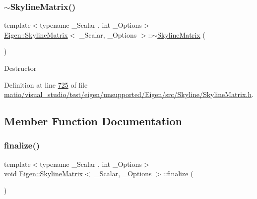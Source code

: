 \mbox{\label{class_eigen_1_1_skyline_matrix_a456b254a757d26580b2c05fe270eaae7}} 
\subsubsection{\texorpdfstring{$\sim$\+Skyline\+Matrix()}{~SkylineMatrix()}\hspace{0.1cm}{\footnotesize\ttfamily [2/2]}}
{\footnotesize\ttfamily template$<$typename \+\_\+\+Scalar , int \+\_\+\+Options$>$ \\
\hyperlink{class_eigen_1_1_skyline_matrix}{Eigen\+::\+Skyline\+Matrix}$<$ \+\_\+\+Scalar, \+\_\+\+Options $>$\+::$\sim$\hyperlink{class_eigen_1_1_skyline_matrix}{Skyline\+Matrix} (\begin{DoxyParamCaption}{ }\end{DoxyParamCaption})\hspace{0.3cm}{\ttfamily [inline]}}

Destructor 

Definition at line \hyperlink{matio_2visual__studio_2test_2eigen_2unsupported_2_eigen_2src_2_skyline_2_skyline_matrix_8h_source_l00725}{725} of file \hyperlink{matio_2visual__studio_2test_2eigen_2unsupported_2_eigen_2src_2_skyline_2_skyline_matrix_8h_source}{matio/visual\+\_\+studio/test/eigen/unsupported/\+Eigen/src/\+Skyline/\+Skyline\+Matrix.\+h}.



\subsection{Member Function Documentation}
\mbox{\label{class_eigen_1_1_skyline_matrix_a1269310d041fb3ca2a980644f3cfe5a2}} 
\subsubsection{\texorpdfstring{finalize()}{finalize()}\hspace{0.1cm}{\footnotesize\ttfamily [1/2]}}
{\footnotesize\ttfamily template$<$typename \+\_\+\+Scalar , int \+\_\+\+Options$>$ \\
void \hyperlink{class_eigen_1_1_skyline_matrix}{Eigen\+::\+Skyline\+Matrix}$<$ \+\_\+\+Scalar, \+\_\+\+Options $>$\+::finalize (\begin{DoxyParamCaption}{ }\end{DoxyParamCaption})\hspace{0.3cm}{\ttfamily [inline]}}

